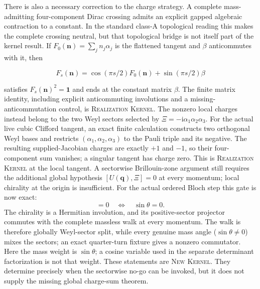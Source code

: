 \documentclass[11pt]{article}
\newcommand{\Kernel}{\textcolor{kernelcolor}{\textsc{Kernel}}}
\newcommand{\NewResult}{\textsc{New}}
\newcommand{\Realization}{\textsc{Realization}}
\newcommand{\ii}{\mathrm{i}}
\newcommand{\id}{\mathbf{1}}
\begin{document}
There is also a necessary correction to the charge strategy.  A complete
mass-admitting four-component Dirac crossing admits an explicit gapped
algebraic contraction to a constant.  In the standard class-A topological
reading this makes the complete crossing neutral, but that topological bridge
is not itself part of the kernel result.  If
$F_0(\mathbf n)=\sum_j n_j\alpha_j$ is the flattened tangent and $\beta$
anticommutes with it, then

\begin{equation}
 F_s(\mathbf n)=\cos(\pi s/2)F_0(\mathbf n)+\sin(\pi s/2)\beta
\end{equation}

satisfies $F_s(\mathbf n)^2=\id$ and ends at the constant matrix $\beta$.
The finite matrix identity, including explicit anticommuting involutions and a
missing-anticommutation control, is \Realization{} \Kernel{}.  The nonzero
local charges instead belong to the two Weyl sectors selected by
$\Xi=-\ii\alpha_1\alpha_2\alpha_3$.  For the actual live cubic Clifford
tangent, an exact finite calculation constructs two orthogonal Weyl bases and
restricts $(\alpha_1,\alpha_2,\alpha_3)$ to the Pauli triple and its negative.
The resulting supplied-Jacobian charges are exactly $+1$ and $-1$, so their
four-component sum vanishes; a singular tangent has charge zero.  This is
\Realization{} \Kernel{} at the local tangent.  A sectorwise Brillouin-zone
argument still requires the additional global hypothesis
$[U(\mathbf q),\Xi]=0$ at every momentum; local chirality at the origin is
insufficient.  For the actual ordered Bloch step this gate is now exact:
\begin{equation}
 [U(\mathbf q,\theta),\Xi]=0
 \quad\Longleftrightarrow\quad
 \sin\theta=0.
\end{equation}
The chirality is a Hermitian involution, and its positive-sector projector
commutes with the complete massless walk at every momentum.  The walk is
therefore globally Weyl-sector split, while every genuine mass angle
($\sin\theta\ne0$) mixes the sectors; an exact quarter-turn fixture gives a
nonzero commutator.  Here the mass weight is $\sin\theta$; a cosine variable
used in the separate determinant factorization is not that weight.  These
statements are \NewResult{} \Kernel{}.  They determine precisely when the
sectorwise no-go can be invoked, but it does not supply the missing global
charge-sum theorem.
\end{document}
